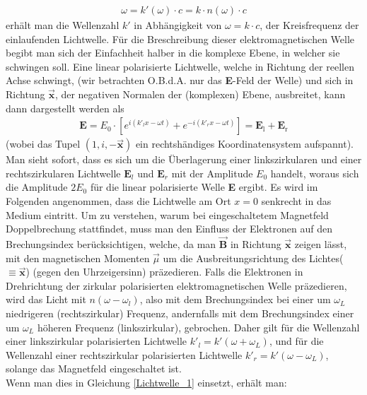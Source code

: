 \documentclass[12pt,a4paper]{article}
\begin{document}
\begin{align}
\omega = k'(\omega)\cdot c = k\cdot n(\omega)\cdot c
\label{Dispersionsrelation}
\end{align}
erhält man die Wellenzahl $k'$ in Abhängigkeit von $\omega = k\cdot c$, der Kreisfrequenz der einlaufenden Lichtwelle.
Für die Breschreibung dieser elektromagnetischen Welle begibt man sich der Einfachheit halber in die komplexe Ebene, in welcher sie schwingen soll. Eine linear polarisierte Lichtwelle, welche in Richtung der reellen Achse schwingt, (wir betrachten O.B.d.A. nur das \textbf{E}-Feld der Welle) und sich in Richtung $\vec{\textbf{x}}$, der negativen Normalen der (komplexen) Ebene, ausbreitet, kann dann dargestellt werden als
 \begin{align}
\textbf{E} = E_0\cdot[e^{i( k'_l x - \omega t)}+e^{-i( k'_r x - \omega t )}] = \textbf{E}_{\text{l}} + \textbf{E}_{\text{r}}
\label{Lichtwelle_1}
 \end{align}
(wobei das Tupel $(1,i,-\vec{\textbf{x}})$ ein rechtshändiges Koordinatensystem aufspannt).
Man sieht sofort, dass es sich um die Überlagerung einer linkszirkularen und einer rechtszirkularen Lichtwelle $\textbf{E}_l$ und $\textbf{E}_r$ mit der Amplitude $E_0$ handelt, woraus sich die Amplitude $2E_0$ für die linear polarisierte Welle \textbf{E} ergibt.\newpage \noindent
Es wird im Folgenden angenommen, dass die Lichtwelle am Ort $x=0$ senkrecht in das Medium eintritt. Um zu verstehen, warum bei eingeschaltetem Magnetfeld Doppelbrechung stattfindet, muss man den Einfluss der Elektronen auf den Brechungsindex berücksichtigen, welche, da man $\vec{\textbf{B}}$ in Richtung $\vec{\textbf{x}}$ zeigen lässt, mit den magnetischen Momenten $\vec{\mu}$ um die Ausbreitungsrichtung des Lichtes($ \equiv \vec{\textbf{x}}$) (gegen den Uhrzeigersinn) präzedieren. Falls die Elektronen in Drehrichtung der zirkular polarisierten elektromagnetischen Welle präzedieren, wird das Licht mit $n(\omega-\omega_l)$, also mit dem Brechungsindex bei einer um $\omega_L$ niedrigeren (rechtszirkular) Frequenz, andernfalls mit dem Brechungsindex einer um $\omega_L$ höheren Frequenz (linkszirkular), gebrochen. Daher gilt für die Wellenzahl einer linkszirkular polarisierten Lichtwelle $k'_l = k'(\omega + \omega_L)$, und für die Wellenzahl einer rechtszirkular polarisierten Lichtwelle $k'_r = k'(\omega - \omega_L)$, solange das Magnetfeld eingeschaltet ist.\\
Wenn man dies in Gleichung \ref{Lichtwelle_1} einsetzt, erhält man:
\end{document}
